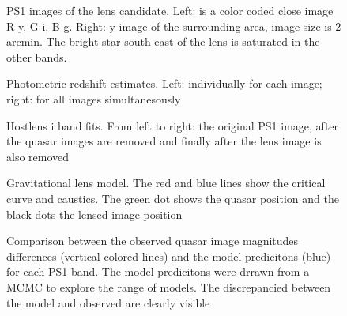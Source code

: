 \documentclass[manuscript]{aastex}
\begin{document}
\begin{figure}
\caption{
PS1 images of the lens candidate. Left: is a color coded close image R-y, G-i, B-g. Right: y image of the surrounding area, image size is 2 arcmin. The bright star south-east of the lens is saturated in the other bands.
}
\label{lens}
\end{figure}



\begin{figure}
\caption{
Photometric redshift estimates. 
Left: individually for each image; right: for all images simultanesously}
\label{redshift}
\end{figure}


\begin{figure}
\caption{
Hostlens i band fits. From left to right: the original PS1 image, after the quasar images are removed and finally after the lens image is also removed}
\label{hostlensi}
\end{figure}


\begin{figure}
\caption{
Gravitational lens model. The red and blue lines show the critical curve and caustics. The green dot shows the quasar position and the black dots the lensed image position}
\label{model}
\end{figure}


\begin{figure}
\caption{
Comparison between the observed quasar image magnitudes differences (vertical colored lines) and the model predicitons (blue) for each PS1 band. The model predicitons were drrawn from a MCMC to explore the range of models. The discrepancied between the model and observed are clearly visible}
\label{modelphot}
\end{figure}
\end{document}
